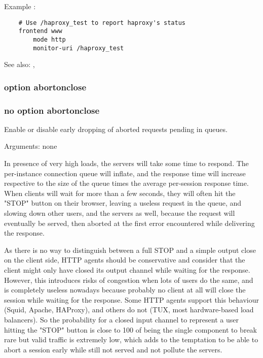   Example :
\begin{verbatim}
    # Use /haproxy_test to report haproxy's status
    frontend www
        mode http
        monitor-uri /haproxy_test
\end{verbatim}

  See also: , 

\subsubsection[option abortonclose]{option abortonclose}
\subsubsection[no option abortonclose]{no option abortonclose}
  
  Enable or disable early dropping of aborted requests pending in queues.

   
  Arguments: none

  In presence of very high loads, the servers will take some time to respond.
  The per-instance connection queue will inflate, and the response time will
  increase respective to the size of the queue times the average per-session
  response time. When clients will wait for more than a few seconds, they will
  often hit the "STOP" button on their browser, leaving a useless request in
  the queue, and slowing down other users, and the servers as well, because the
  request will eventually be served, then aborted at the first error
  encountered while delivering the response.

  As there is no way to distinguish between a full STOP and a simple output
  close on the client side, HTTP agents should be conservative and consider
  that the client might only have closed its output channel while waiting for
  the response. However, this introduces risks of congestion when lots of users
  do the same, and is completely useless nowadays because probably no client at
  all will close the session while waiting for the response. Some HTTP agents
  support this behaviour (Squid, Apache, HAProxy), and others do not (TUX, most
  hardware-based load balancers). So the probability for a closed input channel
  to represent a user hitting the "STOP" button is close to 100%
  of being the single component to break rare but valid traffic is extremely
  low, which adds to the temptation to be able to abort a session early while
  still not served and not pollute the servers.

